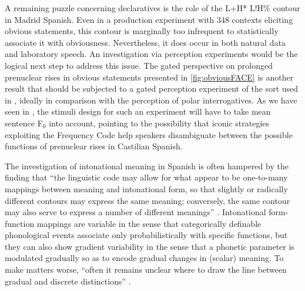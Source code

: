 A remaining puzzle concerning declaratives is the role of the L+H* L!H\% contour in Madrid Spanish. Even in a production experiment with 348 contexts eliciting obvious statements, this contour is margi\-nally too infrequent to statistically associate it with obviousness. Nevertheless, it does occur in both natural data and laboratory speech. An investigation via perception experiments would be the logical next step to address this issue. The gated perspective on prolonged prenuclear rises in obvious statements presented in \autoref{fig:obviousFACE} is another result that should be subjected to a gated perception experiment of the sort used in \citet{Face2007}, ideally in comparison with the perception of polar interrogatives. As we have seen in , the stimuli design for such an experiment will have to take mean sentence F$_0$ into account, pointing to the possibility that iconic strategies exploiting the Frequency Code \citep{Gussenhoven2004} help speakers disambiguate between the possible functions of prenuclear rises in Castilian Spanish. 

The investigation of intonational meaning in Spanish is often hampered by the finding that ``the linguistic code may allow for what appear to be one-to-many mappings between meaning and intonational form, so that slightly or radically different contours may express the same meaning; conversely, the same contour may also serve to express a number of different meanings'' \citep[390]{HualdePrieto2015}. Intonational form-function mappings are variable in the sense that categorically definable phonological events associate only probabilistically with specific functions, but they can also show gradient variability in the sense that a phonetic parameter is modulated gradually so as to encode gradual changes in (scalar) meaning. To make matters worse, ``often it remains unclear where to draw the line between gradual and discrete distinctions'' \citep[145]{Roettger.2017}.

